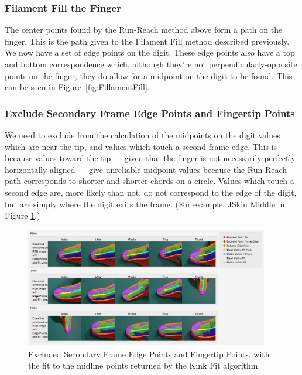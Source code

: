 \subsubsection{Filament Fill the Finger}\label{FilamentFillTheFinger}
The center points found by the Run-Reach method above form a path on the finger. This is the path given to the Filament Fill method described previously. We now have a set of edge points on the digit. These edge points also have a top and bottom correspondence which, although they're not perpendicularly-opposite points on the finger, they do allow for a midpoint on the digit to be found. This can be seen in Figure~\ref{fig:FillamentFill}.

\subsubsection{Exclude Secondary Frame Edge Points and Fingertip Points }\label{sec:ExcludeSecondaryFrameEdgePointsAndFingertipPoints}
We need to exclude from the calculation of the midpoints on the digit values which are near the tip, and values which touch a second frame edge. This is because values toward the tip --- given that the finger is not necessarily perfectly horizontally-aligned --- give unreliable midpoint values because the Run-Reach path corresponds to shorter and shorter chords on a circle. Values which touch a second edge are, more likely than not, do not correspond to the edge of the digit, but are simply where the digit exits the frame. (For example, JSkin Middle in Figure \ref{fig:ExcludedEdgePointsAndMidlineFit}.)

\begin{figure}[h!]
  \centering
    \includegraphics[width=0.95\textwidth]{Chapter4/Figs/ExcludedEdgePointsAndMidlineFit.jpg}
    \caption{Excluded Secondary Frame Edge Points and Fingertip Points, with the fit to the midline points returned by the Kink Fit algorithm.}\label{fig:ExcludedEdgePointsAndMidlineFit}
\end{figure}

